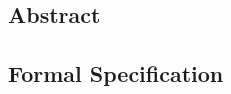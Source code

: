 \subsection{Abstract}
\label{sec:play-abstract}


\subsection{Formal Specification}
\label{sec:play-formal}

